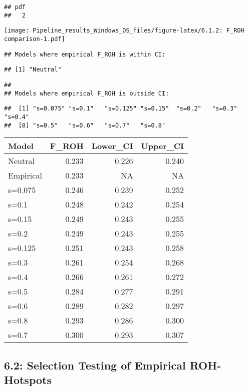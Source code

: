 \documentclass[
]{article}
\begin{document}
\begin{verbatim}
## pdf 
##   2
\end{verbatim}

\texttt{[image: Pipeline\_results\_Windows\_OS\_files/figure-latex/6.1.2: F\_ROH comparison-1.pdf]}

\begin{verbatim}
## Models where empirical F_ROH is within CI:
\end{verbatim}

\begin{verbatim}
## [1] "Neutral"
\end{verbatim}

\begin{verbatim}
## 
## Models where empirical F_ROH is outside CI:
\end{verbatim}

\begin{verbatim}
##  [1] "s=0.075" "s=0.1"   "s=0.125" "s=0.15"  "s=0.2"   "s=0.3"   "s=0.4"  
##  [8] "s=0.5"   "s=0.6"   "s=0.7"   "s=0.8"
\end{verbatim}

\begin{longtable}[]{@{}lrrr@{}}
\toprule\noalign{}
Model & F\_ROH & Lower\_CI & Upper\_CI \\
\midrule\noalign{}
\endhead
\bottomrule\noalign{}
\endlastfoot
Neutral & 0.233 & 0.226 & 0.240 \\
Empirical & 0.233 & NA & NA \\
s=0.075 & 0.246 & 0.239 & 0.252 \\
s=0.1 & 0.248 & 0.242 & 0.254 \\
s=0.15 & 0.249 & 0.243 & 0.255 \\
s=0.2 & 0.249 & 0.243 & 0.255 \\
s=0.125 & 0.251 & 0.243 & 0.258 \\
s=0.3 & 0.261 & 0.254 & 0.268 \\
s=0.4 & 0.266 & 0.261 & 0.272 \\
s=0.5 & 0.284 & 0.277 & 0.291 \\
s=0.6 & 0.289 & 0.282 & 0.297 \\
s=0.8 & 0.293 & 0.286 & 0.300 \\
s=0.7 & 0.300 & 0.293 & 0.307 \\
\end{longtable}

\subsection{6.2: Selection Testing of Empirical
ROH-Hotspots}\label{selection-testing-of-empirical-roh-hotspots}
\end{document}
